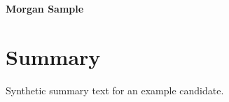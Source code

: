 \documentclass[11pt,a4paper]{article}
\begin{document}
\RaggedRight
{\LARGE\bfseries Morgan Sample}\par
\section*{Summary}
Synthetic summary text for an example candidate.
\end{document}
